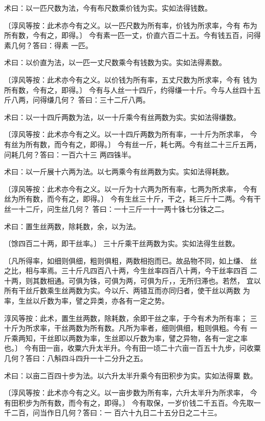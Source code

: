 \documentclass[a4paper,12pt,UTF8,twoside]{ctexbook}
\begin{document}
术曰：以一匹尺数为法，今有布尺数乘价钱为实。实如法得钱数。

〔淳风等按：此术亦今有之义。以一匹尺数为所有率，价钱为所求率，今有 布为所有数，今有之，即得。〕 今有素一匹一丈，价直六百二十五。今有钱五百，问得素几何？答曰：得素 一匹。

术曰：以价直为法，以一匹一丈尺数乘今有钱数为实。实如法得素数。

〔淳风等按：此术亦今有之义。以价钱为所有率，五丈尺数为所求率，今有 钱为所有数，今有之，即得。〕 今有与人丝一十四斤，约得缣一十斤。今与人丝四十五斤八两，问得缣几何？ 答曰：三十二斤八两。

术曰：以一十四斤两数为法，以一十斤乘今有丝两数为实。实如法得缣数。

〔淳风等按：此术亦今有之义。以一十四斤两数为所有率，一十斤为所求率， 今有丝为所有数，而今有之，即得。〕 今有丝一斤，耗七两。今有丝二十三斤五两，问耗几何？答曰：一百六十三 两四铢半。

术曰：以一斤展十六两为法。以七两乘今有丝两数为实。实如法得耗数。

〔淳风等按：此术亦今有之义。以一斤为十六两为所有率，七两为所求率， 今有丝为所有数，而今有之，即得。〕 今有生丝三十斤，干之，耗三斤十二两。今有干丝一十二斤，问生丝几何？ 答曰：一十三斤一十一两十铢七分铢之二。

术曰：置生丝两数，除耗数，余，以为法。

〔馀四百二十两，即干丝率。〕 三十斤乘干丝两数为实。实如法得生丝数。

〔凡所得率，如细则俱细，粗则俱粗，两数相抱而已。故品物不同，如上缣、 丝之比，相与率焉。三十斤凡四百八十两，今生丝率四百八十两，今干丝率四百 二十两，则其数相通。可俱为铢，可俱为两，可俱为斤，，无所归滞也。若然， 宜以所有干丝斤数乘生丝两数为实。今以斤、两错互而亦同归者，使干丝以两数 为率，生丝以斤数为率，譬之异类，亦各有一定之势。

淳风等按：此术，置生丝两数，除耗数，余即干丝之率，于今有术为所有率； 三十斤为所求率，干丝两数为所有数。凡所为率者，细则俱细，粗则俱粗。今有 一斤乘两知，干丝即以两数为率，生丝即以斤数为率，譬之异物，各有一定之率 也。〕 今有田一亩，收粟六升太半升。今有田一顷二十六亩一百五十九步，问收粟 几何？答曰：八斛四斗四升一十二分升之五。

术曰：以亩二百四十步为法。以六升太半升乘今有田积步为实。实如法得粟 数。

〔淳风等按：此术亦今有之义。以一亩步数为所有率，六升太半升为所求率， 今有田积步为所有数，而今有之，即得。〕 今有取保，一岁价钱二千五百。今先取一千二百，问当作日几何？答曰：一 百六十九日二十五分日之二十三。
\end{document}

